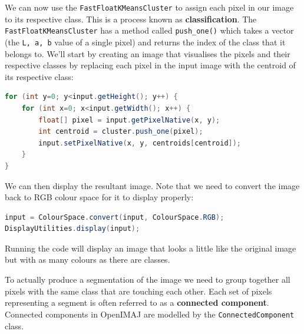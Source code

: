 We can now use the \verb+FastFloatKMeansCluster+ to assign each pixel in our image to its respective 
class. This is a process known as \textbf{classification}. The \verb+FastFloatKMeansCluster+ has a method 
called \verb+push_one()+ which takes a vector (the \verb+L, a, b+ value of a single pixel) and 
returns the index of the class that it belongs to. We'll start by creating an image that 
visualises the pixels and their respective classes by replacing each pixel in the input image 
with the centroid of its respective class:
\begin{lstlisting}[language=java]
for (int y=0; y<input.getHeight(); y++) {
    for (int x=0; x<input.getWidth(); x++) {
        float[] pixel = input.getPixelNative(x, y);
        int centroid = cluster.push_one(pixel);
        input.setPixelNative(x, y, centroids[centroid]);
    }
}
\end{lstlisting}
We can then display the resultant image. Note that we need to convert the image back to RGB 
colour space for it to display properly:
\begin{lstlisting}[language=java]
input = ColourSpace.convert(input, ColourSpace.RGB);
DisplayUtilities.display(input);
\end{lstlisting}
Running the code will display an image that looks a little like the original image but with 
as many colours as there are classes. 

To actually produce a segmentation of the image we need to group together all pixels with 
the same class that are touching each other. Each set of pixels representing a segment is 
often referred to as a \textbf{connected component}. Connected components in OpenIMAJ are
modelled by the \verb+ConnectedComponent+ class.

